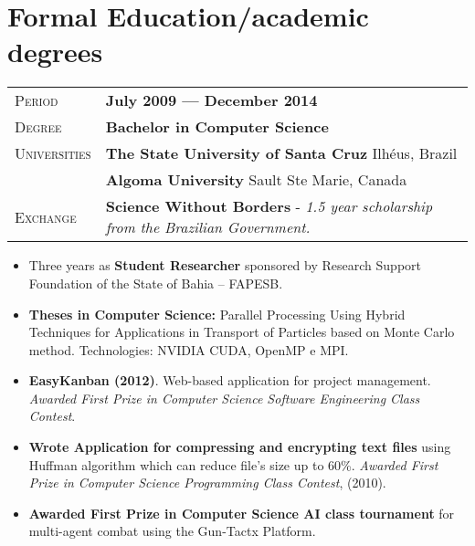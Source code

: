 \documentclass[10pt, a4paper, oneside, final]{scrartcl} %
\newcommand{\gray}{\rowcolor[gray]{.90}} %
\begin{document}


\section{Formal Education/academic degrees}

\begin{center}
\begin{tabularx}{1.0\linewidth}{>{\raggedleft\scshape}p{2.34cm}X}
\gray Period & \textbf{July 2009 --- December 2014}\\
\gray Degree & \textbf{Bachelor in Computer Science}\\
\gray Universities & \textbf{The State University of Santa Cruz} \hfill Ilhéus, Brazil\\ 
\gray & \textbf{Algoma University} \hfill Sault Ste Marie, Canada\\
\gray Exchange & \textbf{Science Without Borders} - \textit{1.5 year scholarship from the Brazilian Government.}
\end{tabularx}
\end{center}

\begin{itemize}\itemsep1.5pt

\item Three years as \textbf{Student Researcher} sponsored by Research Support Foundation of the State of Bahia – FAPESB.

\item \textbf{Theses in Computer Science:} Parallel Processing Using Hybrid Techniques for Applications in Transport of Particles based on Monte Carlo method. Technologies: NVIDIA CUDA, OpenMP e MPI.
   
\item \textbf{EasyKanban (2012)}. Web-based application for project management. \textit{Awarded First Prize in Computer Science Software Engineering Class Contest}.
  
\item \textbf{Wrote Application for compressing and encrypting text files} using Huffman algorithm which can reduce file's size up to 60\%. \textit{Awarded First Prize in Computer Science Programming Class Contest}, (2010). 


\item \textbf{Awarded First Prize in Computer Science AI class tournament} for multi-agent combat using the Gun-Tactx Platform.
  
\end{itemize}
\end{document}
